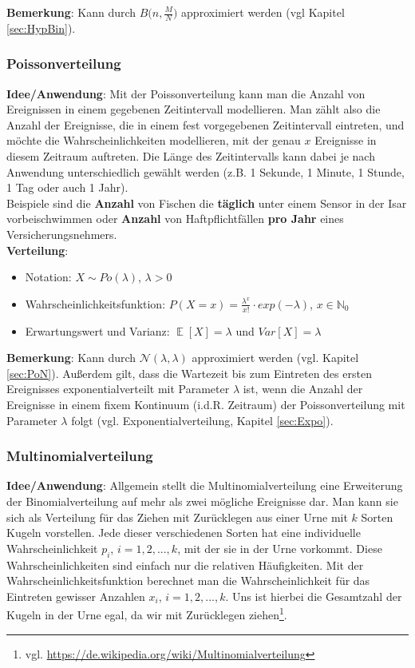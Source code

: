 \documentclass[a4paper]{article}
\DeclareMathOperator*{\E}{\mathbb{E}}
\begin{document}
\noindent \textbf{Bemerkung}: Kann durch $B\Big(n,\frac{M}{N}\Big)$ approximiert werden (vgl Kapitel \ref{sec:HypBin}).

\subsubsection{Poissonverteilung} \label{sec:Poi}
\textbf{Idee/Anwendung}: Mit der Poissonverteilung kann man die Anzahl von Ereignissen in einem gegebenen Zeitintervall modellieren. Man zählt also die Anzahl der Ereignisse, die in einem fest vorgegebenen Zeitintervall eintreten, und möchte die Wahrscheinlichkeiten modellieren, mit der genau $x$ Ereignisse in diesem Zeitraum auftreten. Die Länge des Zeitintervalls kann dabei je nach Anwendung unterschiedlich gewählt werden (z.B. 1 Sekunde, 1 Minute, 1 Stunde, 1 Tag oder auch 1 Jahr). \\

\noindent Beispiele sind die \textbf{Anzahl} von Fischen die \textbf{täglich} unter einem Sensor in der Isar vorbeischwimmen oder \textbf{Anzahl} von Haftpflichtfällen \textbf{pro Jahr} eines Versicherungsnehmers. \\

\noindent \textbf{Verteilung}:
\begin{itemize}
\item[] Notation: $X\sim Po(\lambda)$, $\lambda > 0$
\item[] Wahrscheinlichkeitsfunktion: $P(X=x)=\frac{\lambda^x}{x!}\cdot exp(-\lambda)$, $x \in \mathbb{N}_0$
\item[] Erwartungswert und Varianz: $\E[X]=\lambda$ und $Var[X]=\lambda$

\end{itemize}

\noindent \textbf{Bemerkung}: Kann durch $\mathcal{N}(\lambda,\lambda)$ approximiert werden (vgl. Kapitel \ref{sec:PoN}). Außerdem gilt, dass die Wartezeit bis zum Eintreten des ersten Ereignisses exponentialverteilt mit Parameter $\lambda$ ist, wenn die Anzahl der Ereignisse in einem fixem Kontinuum (i.d.R. Zeitraum) der Poissonverteilung mit Parameter $\lambda$ folgt (vgl. Exponentialverteilung, Kapitel \ref{sec:Expo}). 

\subsubsection{Multinomialverteilung} \label{sec:Multi}

\textbf{Idee/Anwendung}: Allgemein stellt die Multinomialverteilung eine Erweiterung der Binomialverteilung auf mehr als zwei mögliche Ereignisse dar. Man kann sie sich als Verteilung für das Ziehen mit Zurücklegen aus einer Urne mit $k$ Sorten Kugeln vorstellen. Jede dieser verschiedenen Sorten hat eine individuelle Wahrscheinlichkeit $p_i$, $i=1,2,...,k$, mit der sie in der Urne vorkommt. Diese Wahrscheinlichkeiten sind einfach nur die relativen Häufigkeiten. Mit der Wahrscheinlichkeitsfunktion berechnet man die Wahrscheinlichkeit für das Eintreten gewisser Anzahlen $x_i$, $i=1,2,...,k$. Uns ist hierbei die Gesamtzahl der Kugeln in der Urne egal, da wir mit Zurücklegen ziehen\footnote{vgl. \url{https://de.wikipedia.org/wiki/Multinomialverteilung}}. \\
\end{document}
